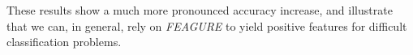 \documentclass{article}
\theoremstyle{definition}
\begin{document}
These results show a much more pronounced accuracy increase, and illustrate that we can, in general, rely on \emph{FEAGURE} to yield positive features for difficult classification problems.

		
		
		
		
		


\end{document}

